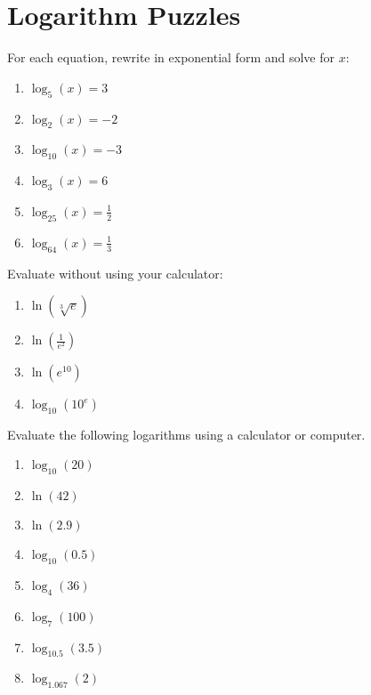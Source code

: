 \section{Logarithm Puzzles}

\begin{puzzle}
    For each equation, rewrite in exponential form and solve for \(x\):
    \begin{enumerate}
        \item \(\log_5 (x) = 3\)
        \item \(\log_2 (x) = -2\)
        \item \(\log_{10} (x) = -3\)
        \item \(\log_3 (x) = 6\)
        \item \(\log_{25} (x) = \frac{1}{2}\)
        \item \(\log_{64} (x) = \frac{1}{3}\)
    \end{enumerate}
\end{puzzle}

\begin{puzzle}
    Evaluate without using your calculator:
    \begin{enumerate}
        \item \(\ln (\sqrt[3]{e})\)
        \item \(\ln \left(\frac{1}{e^2}\right)\)
        \item \(\ln (e^{10})\)
        \item \(\log_{10} (10^{e})\)
    \end{enumerate}
\end{puzzle}

\begin{puzzle}
    Evaluate the following logarithms using a calculator or computer.
    \begin{enumerate}
        \item \(\log_{10} (20)\)
        \item \(\ln (42)\)
        \item \(\ln (2.9)\)
        \item \(\log_{10} (0.5)\)
        \item \(\log_{4} (36)\)
        \item \(\log_{7} (100)\)
        \item \(\log_{10.5} (3.5)\)
        \item \(\log_{1.067} (2)\)
    \end{enumerate}
\end{puzzle}

